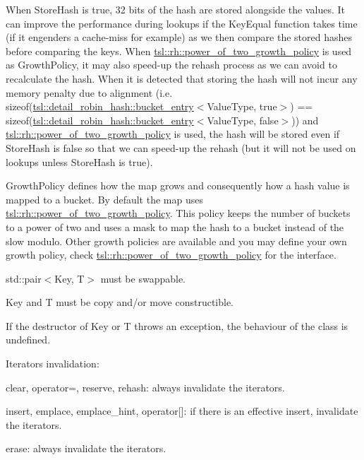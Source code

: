 When {\ttfamily Store\+Hash} is true, 32 bits of the hash are stored alongside the values. It can improve the performance during lookups if the {\ttfamily Key\+Equal} function takes time (if it engenders a cache-\/miss for example) as we then compare the stored hashes before comparing the keys. When {\ttfamily \mbox{\hyperlink{classtsl_1_1rh_1_1power__of__two__growth__policy}{tsl\+::rh\+::power\+\_\+of\+\_\+two\+\_\+growth\+\_\+policy}}} is used as {\ttfamily Growth\+Policy}, it may also speed-\/up the rehash process as we can avoid to recalculate the hash. When it is detected that storing the hash will not incur any memory penalty due to alignment (i.\+e. {\ttfamily sizeof(\mbox{\hyperlink{classtsl_1_1detail__robin__hash_1_1bucket__entry}{tsl\+::detail\+\_\+robin\+\_\+hash\+::bucket\+\_\+entry}}$<$Value\+Type, true$>$) == sizeof(\mbox{\hyperlink{classtsl_1_1detail__robin__hash_1_1bucket__entry}{tsl\+::detail\+\_\+robin\+\_\+hash\+::bucket\+\_\+entry}}$<$Value\+Type, false$>$)}) and {\ttfamily \mbox{\hyperlink{classtsl_1_1rh_1_1power__of__two__growth__policy}{tsl\+::rh\+::power\+\_\+of\+\_\+two\+\_\+growth\+\_\+policy}}} is used, the hash will be stored even if {\ttfamily Store\+Hash} is false so that we can speed-\/up the rehash (but it will not be used on lookups unless {\ttfamily Store\+Hash} is true).

{\ttfamily Growth\+Policy} defines how the map grows and consequently how a hash value is mapped to a bucket. By default the map uses {\ttfamily \mbox{\hyperlink{classtsl_1_1rh_1_1power__of__two__growth__policy}{tsl\+::rh\+::power\+\_\+of\+\_\+two\+\_\+growth\+\_\+policy}}}. This policy keeps the number of buckets to a power of two and uses a mask to map the hash to a bucket instead of the slow modulo. Other growth policies are available and you may define your own growth policy, check {\ttfamily \mbox{\hyperlink{classtsl_1_1rh_1_1power__of__two__growth__policy}{tsl\+::rh\+::power\+\_\+of\+\_\+two\+\_\+growth\+\_\+policy}}} for the interface.

{\ttfamily std\+::pair$<$Key, T$>$} must be swappable.

{\ttfamily Key} and {\ttfamily T} must be copy and/or move constructible.

If the destructor of {\ttfamily Key} or {\ttfamily T} throws an exception, the behaviour of the class is undefined.

Iterators invalidation\+:
\begin{DoxyItemize}
\item clear, operator=, reserve, rehash\+: always invalidate the iterators.
\item insert, emplace, emplace\+\_\+hint, operator\mbox{[}\mbox{]}\+: if there is an effective insert, invalidate the iterators.
\item erase\+: always invalidate the iterators. 
\end{DoxyItemize}

